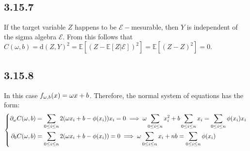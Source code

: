 \documentclass{exam}
\begin{document}
\subsection*{3.15.7}
If the target variable $Z$ happens to be $\mathcal{E}-$mesurable, then $Y$ is independent of the sigma algebra $\mathcal{E}$. From this follows that $C(\omega, b) = \text{d}(Z,Y)^2 = \mathbb{E} \left[ (Z - \mathbb{E}\left[ Z |\mathcal{E} \right] )^2\right]  = \mathbb{E} \left[ (Z - Z)^2\right] = 0$.

\subsection*{3.15.8}
In this case $f_{\tiny \omega, b}(x) = \omega x + b$. Therefore, the normal system of equations has the form:\\
\begin{equation}
        \left\{
        \begin{aligned}
               \partial_{\omega}C(\omega, b)&= \displaystyle \sum_{\tiny 0 \leq i\leq n } 2(\omega x_i + b -\phi(x_i)) x_i = 0 \implies \omega \displaystyle\sum_{\tiny 0 \leq i\leq n }x^2 _i + b \displaystyle\sum_{\tiny 0 \leq i\leq n } x_i = \displaystyle\sum_{\tiny 0 \leq i\leq n }\phi(x_i) x_i \\
               \partial_{b}C(\omega, b) &= \displaystyle \sum_{0 \leq i\leq n }  2(\omega x_i + b -\phi(x_i))  = 0 \implies \omega \displaystyle\sum_{\tiny 0 \leq i\leq n }x _i + nb = \displaystyle\sum_{\tiny 0 \leq i\leq n }\phi(x_i)
        \end{aligned}
        \right.
\end{equation}
\end{document}
